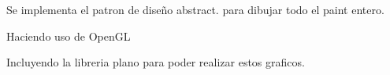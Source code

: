 Se implementa el patron de diseño abstract. para dibujar todo el paint entero.


\begin{DoxyItemize}
\item Haciendo uso de Open\+GL
\item Incluyendo la libreria plano para poder realizar estos graficos. 
\end{DoxyItemize}